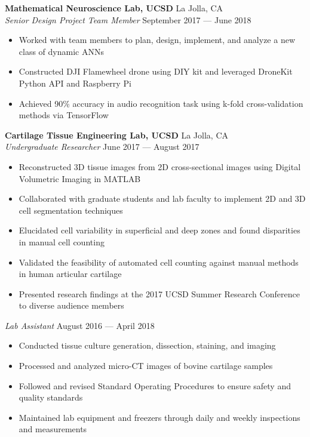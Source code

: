 \documentclass{article}
\newcommand{\lineunder} {
    \vspace*{-8pt} \\
    \hspace*{-18pt} \hrulefill \\
}
\newcommand{\header} [1] {
    {\hspace*{-18pt}\vspace*{6pt} \Large{#1} }
    \vspace*{-6pt} 
    \lineunder
}
\begin{document}
\textbf{Mathematical Neuroscience Lab, UCSD} \hfill La Jolla, CA\\
\textit{Senior Design Project Team Member} \hfill September 2017 --- June 2018\\
\vspace{-2mm}
\begin{itemize} \itemsep 0.05pt
	\item Worked with team members to plan, design, implement, and analyze a new class of dynamic ANNs
	\item Constructed DJI Flamewheel drone using DIY kit and leveraged DroneKit Python API and Raspberry Pi
	\item Achieved 90\% accuracy in audio recognition task using k-fold cross-validation methods via TensorFlow
	
\end{itemize}

\textbf{Cartilage Tissue Engineering Lab, UCSD} \hfill La Jolla, CA\\
\textit{Undergraduate Researcher} \hfill June 2017 --- August 2017\\
\vspace{-2mm}
\begin{itemize} \itemsep 0.05pt
	\item Reconstructed 3D tissue images from 2D cross-sectional images using Digital Volumetric Imaging in MATLAB
	\item Collaborated with graduate students and lab faculty to implement 2D and 3D cell segmentation techniques
	\item Elucidated cell variability in superficial and deep zones and found disparities in manual cell counting
	\item Validated the feasibility of automated cell counting against manual methods in human articular cartilage
	\item Presented research findings at the 2017 UCSD Summer Research Conference to diverse audience members
\end{itemize}


\textit{Lab Assistant} \hfill August 2016 --- April 2018\\
\vspace{-2mm}
\begin{itemize} \itemsep 0.05pt
	\item Conducted tissue culture generation, dissection, staining, and imaging
	\item Processed and analyzed micro-CT images of bovine cartilage samples
	\item Followed and revised Standard Operating Procedures to ensure safety and quality standards
	\item Maintained lab equipment and freezers through daily and weekly inspections and measurements
\end{itemize}
\end{document}

